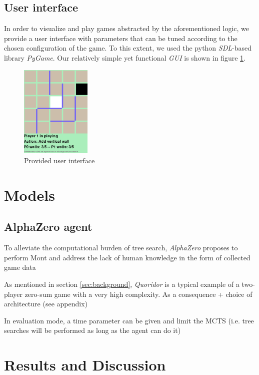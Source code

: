 \documentclass[journal, a4paper]{IEEEtran}
\begin{document}
\subsection{User interface}
In order to visualize and play games abstracted by the aforementioned logic, we provide a user interface with parameters that can be tuned according to the chosen configuration of the game. To this extent, we used the python \textit{SDL}-based library \textit{PyGame}\cite{pygame}. Our relatively simple yet functional \textit{GUI} is shown in figure \ref{fig:gui}.
\begin{figure}
    \centering
    \includegraphics[width=0.3\textwidth]{figures/gui.png}
    \caption{Provided user interface}
    \label{fig:gui}
\end{figure}


\section{Models}
\label{sec:models}

\subsection{AlphaZero agent}
\label{ssec:alphazero}
To alleviate the computational burden of tree search, \textit{AlphaZero}\cite{alphazero} proposes to perform Mont
 and address the lack of human knowledge in the form of collected game data


As mentioned in section \ref{sec:background}, \textit{Quoridor} is a typical example of a two-player zero-sum game with a very high complexity. As a consequence
+ choice of architecture (see appendix)

In evaluation mode, a time parameter can be given and limit the MCTS (i.e. tree searches will be performed as long as the agent can do it)


\section{Results and Discussion}
\label{sec:results}
\end{document}
